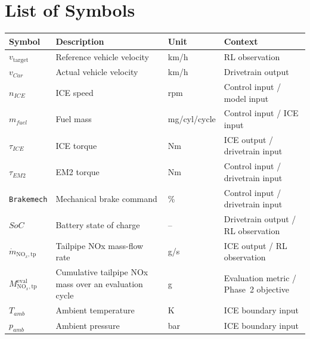 \documentclass[parskip=half, fontsize=11pt]{report}
\begin{document}
\chapter*{List of Symbols}
\markboth{}{}
\begingroup
\begin{longtable}{@{}p{}p{}p{}p{}@{}}
  \toprule
  \textbf{Symbol} & \textbf{Description} & \textbf{Unit} & \textbf{Context} \\
  \midrule
  $v_{\mathrm{target}}$ & Reference vehicle velocity & km/h & RL observation \\
  $v_{Car}$ & Actual vehicle velocity & km/h & Drivetrain output \\
  $n_{ICE}$ & ICE speed & rpm & Control input / model input \\
  $m_{fuel}$ & Fuel mass & mg/cyl/cycle & Control input / ICE input \\
  $\tau_{ICE}$ & ICE torque & Nm & ICE output / drivetrain input \\
  $\tau_{EM2}$ & EM2 torque & Nm & Control input / drivetrain input \\
  \texttt{Brakemech} & Mechanical brake command & \% & Control input / drivetrain input \\
  $SoC$ & Battery state of charge & -- & Drivetrain output / RL observation \\
  $\dot m_{\mathrm{NO}_{x},\mathrm{tp}}$ & Tailpipe NOx mass-flow rate & g/s & ICE output / RL observation \\
  $M_{\mathrm{NO}_{x},\mathrm{tp}}^{\mathrm{eval}}$ & Cumulative tailpipe NOx mass over an evaluation cycle & g & Evaluation metric / Phase~2 objective \\
  $T_{amb}$ & Ambient temperature & K & ICE boundary input \\
  $p_{amb}$ & Ambient pressure & bar & ICE boundary input \\
  \bottomrule
\end{longtable}
\endgroup

\newpage

\setcounter{page}{1}

 \newpage
 \newpage
 \newpage
 \newpage
 \newpage
 \newpage
 \newpage
 \newpage

\appendix
 \newpage

\setcounter{page}{2}
\printbibliography
\end{document}
